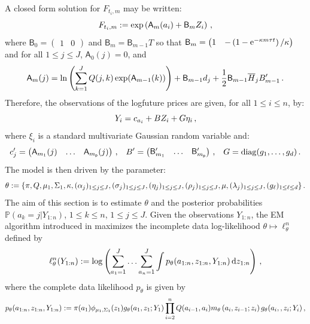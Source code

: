 A closed form solution for $F_{t_i,m}$  may be written:
\[
F_{t_i,m} := \exp\left( \mathsf{A}_{m}(a_{i}) + \mathsf{B}_{m} Z_{i}\right)\,,
\]
where $\mathsf{B}_0	= \begin{pmatrix}1 & 0 \end{pmatrix}$ and  $\mathsf{B}_m    = \mathsf{B}_{m-1} T$ so that  $ \mathsf{B}_m= \begin{pmatrix} 1 & -\left(1-\mathrm{e}^{-\kappa m \tau t}\right)/\kappa \end{pmatrix}$ and
for all $1\le j\le J$, $\mathsf{A}_0(j) = 0$,  and
\begin{equation*}
\mathsf{A}_m(j) = \ln \left(\sum^J_{k=1} Q(j,k) \exp(\mathsf{A}_{m-1}(k)) \right) + \mathsf{B}_{m-1} d_j + \frac{1}{2} \mathsf{B}_{m-1} \overline{H}_j B'_{m-1}\,.
\end{equation*}
Therefore, the observations of the  logfuture prices are given, for all $1\le i\le n$, by:
\[
Y_i = c_{a_i} + B Z_i + G \eta_i\,,
\]
where $\xi_i$ is a standard multivariate Gaussian random variable and:
\[
c_{j}' = \begin{pmatrix} \mathsf{A}_{m_1}(j) & \ldots & \mathsf{A}_{m_{\mathsf{p}}}(j) \end{pmatrix}\,,
\;\;\;
B' = \begin{pmatrix}\mathsf{B}_{m_1}' &  \ldots & \mathsf{B}_{m_{\mathsf{p}}}' \end{pmatrix}\,, \;\;\;
G = \mathrm{diag}(g_1, \ldots , g_{d} )\,.
\]
The model is then driven by the parameter:
\[
\theta := \{\pi, Q, \mu_1, \Sigma_1, \kappa, (\alpha_j)_{1\leq j\leq J}, (\sigma_j)_{1\leq j\leq J}, (\eta_j)_{1\leq j\leq J}, (\rho_j)_{1\leq j\leq J}, \mu, (\lambda_j)_{1\leq j\leq J}, (g_{\ell})_{1\leq \ell\leq d} \}\,.
\]
The aim of this section is to estimate $\theta$ and the posterior probabilities $\mathbb{P}(a_k=j|Y_{1:n})$, $1\le k \le n$, $1\le j \le J$. Given the observations $Y_{1:n}$, the EM algorithm introduced in \cite{dempster:laird:rubin:1977} maximizes the incomplete data log-likelihood $\theta\mapsto \ell_{\theta}^{n}$ defined by
\begin{equation*}
\ell_{\theta}^{n}(Y_{1:n}) := \log\left(\sum_{a_1=1}^J\ldots\sum_{a_n=1}^J\int p_{\theta}(a_{1:n},z_{1:n},Y_{1:n})\,\mathrm{d} z_{1:n}\right)\,,
\end{equation*}
where the complete data likelihood $p_{\theta}$ is given by
\begin{equation*}
p_{\theta}(a_{1:n},z_{1:n},Y_{1:n}) := \pi(a_1)\phi_{\mu_1,\Sigma_1}(z_1)g_{\theta}(a_1,z_1;Y_1)\prod^{n}_{i=2}Q(a_{i-1},a_i)m_{\theta}\left(a_{i},z_{i-1};z_i\right)g_{\theta}(a_i,,z_i;Y_i)\,,
\end{equation*}
